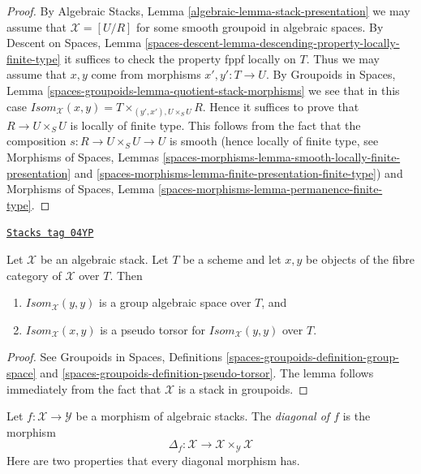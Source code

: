 \begin{proof}
By
Algebraic Stacks, Lemma \ref{algebraic-lemma-stack-presentation}
we may assume that $\mathcal{X} = [U/R]$ for some smooth
groupoid in algebraic spaces.
By
Descent on Spaces,
Lemma \ref{spaces-descent-lemma-descending-property-locally-finite-type}
it suffices to check the property fppf locally on $T$.
Thus we may assume that $x, y$ come from morphisms
$x', y' : T \to U$. By
Groupoids in Spaces,
Lemma \ref{spaces-groupoids-lemma-quotient-stack-morphisms}
we see that in this case
$\mathit{Isom}_\mathcal{X}(x, y) = T \times_{(y', x'), U \times_S U} R$.
Hence it suffices to prove that $R \to U \times_S U$ is
locally of finite type. This follows from the fact that the composition
$s : R \to U \times_S U \to U$ is smooth (hence locally of finite type, see
Morphisms of Spaces, Lemmas
\ref{spaces-morphisms-lemma-smooth-locally-finite-presentation} and
\ref{spaces-morphisms-lemma-finite-presentation-finite-type})
and
Morphisms of Spaces, Lemma \ref{spaces-morphisms-lemma-permanence-finite-type}.
\end{proof}

\begin{lemma}
\label{stacks-morphisms-lemma-isom-pseudo-torsor-aut}
\href{https://stacks.math.columbia.edu/tag/04YP}{\texttt{Stacks tag 04YP}}

Let $\mathcal{X}$ be an algebraic stack.
Let $T$ be a scheme and let $x, y$ be objects of the fibre category of
$\mathcal{X}$ over $T$. Then
\begin{enumerate}
\item $\mathit{Isom}_\mathcal{X}(y, y)$ is a group algebraic space
over $T$, and
\item $\mathit{Isom}_\mathcal{X}(x, y)$ is a pseudo torsor for
$\mathit{Isom}_\mathcal{X}(y, y)$ over $T$.
\end{enumerate}
\end{lemma}

\begin{proof}
See
Groupoids in Spaces,
Definitions \ref{spaces-groupoids-definition-group-space} and
\ref{spaces-groupoids-definition-pseudo-torsor}.
The lemma follows immediately from the fact that $\mathcal{X}$ is a
stack in groupoids.
\end{proof}

Let $f : \mathcal{X} \to \mathcal{Y}$ be a morphism of algebraic stacks.
The {\it diagonal of $f$} is the morphism
$$
\Delta_f :
\mathcal{X}
\longrightarrow
\mathcal{X} \times_\mathcal{Y} \mathcal{X}
$$
Here are two properties that every diagonal morphism has.

